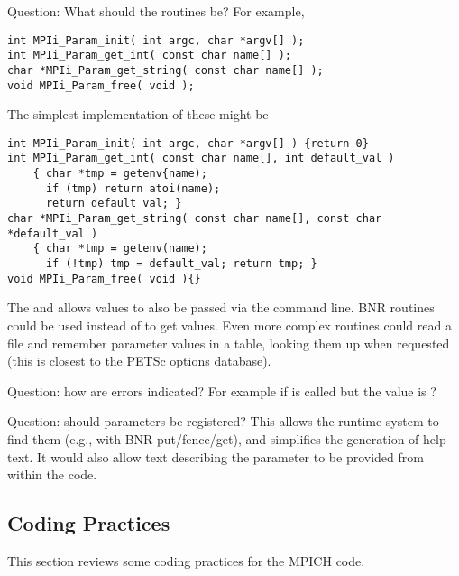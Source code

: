 \documentclass{article}
\begin{document}
Question: What should the routines be?  For 
example,
\begin{verbatim}
int MPIi_Param_init( int argc, char *argv[] );
int MPIi_Param_get_int( const char name[] );
char *MPIi_Param_get_string( const char name[] );
void MPIi_Param_free( void );
\end{verbatim}
The simplest implementation of these might be
\begin{verbatim}
int MPIi_Param_init( int argc, char *argv[] ) {return 0}
int MPIi_Param_get_int( const char name[], int default_val ) 
    { char *tmp = getenv{name); 
      if (tmp) return atoi(name);
      return default_val; }
char *MPIi_Param_get_string( const char name[], const char *default_val ) 
    { char *tmp = getenv(name); 
      if (!tmp) tmp = default_val; return tmp; }
void MPIi_Param_free( void ){}
\end{verbatim}
The  and  allows
values to also be passed via the command line.  BNR routines could be
used instead of  to get values.  Even more complex
routines could read a  file and remember parameter
values in a table, looking them up when requested (this is closest to
the PETSc options database).

Question: how are errors indicated?  For example if
 is called but the value is ?

Question: should parameters be registered?  This allows the runtime
system to find them (e.g., with BNR put/fence/get), and simplifies the
generation of help text.  It 
would also allow text describing the parameter to be provided from
within the code.

\subsection{Coding Practices}
This section reviews some coding practices for the MPICH code.
\end{document}
